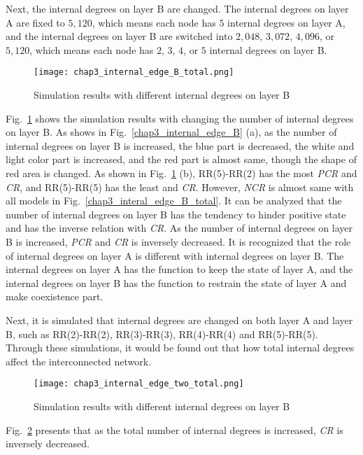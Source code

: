 Next, the internal degrees on layer B are changed. The internal degrees on layer A are fixed to  $5,120$, which means each node has $5$ internal degrees on layer A, and the internal degrees on layer B are switched into $2,048$, $3,072$, $4,096$, or $5,120$, which means each node has $2$, $3$, $4$, or $5$ internal degrees on layer B.  
\begin{figure}[!htb]
	\centering
	\texttt{[image: chap3\_internal\_edge\_B\_total.png]}
	\caption{Simulation results with different internal degrees on layer B}
	\label{chap3_internal_edge_B_total}
\end{figure}

Fig.~\ref{chap3_internal_edge_B_total} shows the simulation results with changing the number of internal degrees on layer B. As shows in Fig.~\ref{chap3_internal_edge_B} (a), as the number of internal degrees on layer B is increased, the blue part is decreased, the white and light color part is increased, and the red part is almost same, though the shape of red area is changed.  As shown in Fig.~\ref{chap3_internal_edge_B_total} (b), RR(5)-RR(2) has the most \textit{PCR} and \textit{CR}, and RR(5)-RR(5) has the least  and \textit{CR}. However, \textit{NCR} is almost same with all models in Fig.~\ref{chap3_interal_edge_B_total}. It can be analyzed that the number of internal degrees on layer B has the tendency to hinder positive state and has the inverse relation with \textit{CR}. As the number of internal degrees on layer B is increased, \textit{PCR} and \textit{CR} is inversely decreased. It is recognized that the role of internal degrees on layer A is different with internal degrees on layer B. The internal degrees on layer A has the function to keep the state of layer A, and the internal degrees on layer B has the function to restrain the state of layer A and make coexistence part. 

Next, it is simulated that internal degrees are changed on both layer A and layer B, such as RR(2)-RR(2), RR(3)-RR(3), RR(4)-RR(4) and RR(5)-RR(5). Through these simulations, it would be found out that how total internal degrees affect the interconnected network.

\begin{figure}[!htb]
	\centering
	\texttt{[image: chap3\_internal\_edge\_two\_total.png]}
	\caption{Simulation results with different internal degrees on layer B}
	\label{chap3_internal_edge_two_total}
\end{figure}


Fig.~\ref{chap3_internal_edge_two_total} presents that as the total number of internal degrees is increased, \textit{CR} is inversely decreased. 




